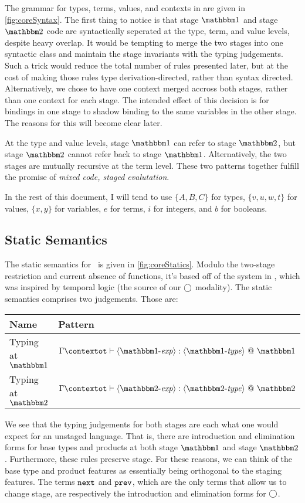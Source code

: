 \documentclass{article}
\begin{document}
The grammar for types, terms, values, and contexts in \ellStaged are given in \ref{fig:coreSyntax}.  The first thing to notice is that stage $\bbone$ and stage $\bbtwo$ code are syntactically seperated at the type, term, and value levels, despite heavy overlap.  It would be tempting to merge the two stages into one syntactic class and maintain the stage invariants with the typing judgements.  Such a trick would reduce the total number of rules presented later, but at the cost of making those rules type derivation-directed, rather than syntax directed.  Alternatively, we chose to have one context merged accross both stages, rather than one context for each stage.  The intended effect of this decision is for bindings in one stage to shadow binding to the same variables in the other stage.  The reasons for this will become clear later.

At the type and value levels, stage $\bbone$ can refer to stage $\bbtwo$, but stage $\bbtwo$ cannot refer back to stage $\bbone$.  Alternatively, the two stages are mutually recursive at the term level.  These two patterns together fulfill the promise of {\em mixed code, staged evalutation}.

In the rest of this document, I will tend to use $\{A,B,C\}$ for types, $\{v,u,w,t\}$ for values, $\{x,y\}$ for variables, $e$ for terms, $i$ for integers, and $b$ for booleans.


\subsection{Static Semantics}

The static semantics for \ellStaged~is given in \ref{fig:coreStatics}.  Modulo the two-stage restriction and current absence of functions, it's based off of the system in \cite{davies96}, which was inspired by temporal logic (the source of our $\bigcirc$ modality).  The static semantics comprises two judgements.  Those are:

\begin{center}
\begin{tabular}{|l|l|} \hline
Name & Pattern \\ \hline
Typing at $\bbone$ & $\typesone[\contextot]{\expro}{\typeo}$ \\  \hline
Typing at $\bbtwo$ & $\typestwo[\contextot]{\exprt}{\typet}$ \\ \hline
\end{tabular}
\end{center}

We see that the typing judgements for both stages are each what one would expect for an unstaged language.  That is, there are introduction and elimination forms for base types and products at both stage $\bbone$ and stage $\bbtwo$.  Furthermore, these rules preserve stage.  For these reasons, we can think of the base type and product features as essentially being orthogonal to the staging features.  The terms ${\tt next}$ and ${\tt prev}$, which are the only terms that allow us to change stage, are respectively the introduction and elimination forms for $\bigcirc$.
\end{document}
